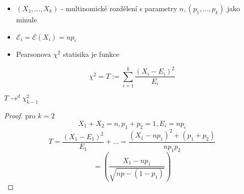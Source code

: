 \documentclass[../main.tex]{subfiles}
\begin{document}
\begin{definition}
    \begin{itemize}
        \item $(X_1,\dots,X_k)$ - multinomické rozdělení s parametry $n, (p_1,\dots,p_k)$ jako minule
        \item $\mathcal{E}_i = \mathcal{E}(X_i) = np_i$
        \item Pearsonova $\chi^2$ statisika je funkce
    \end{itemize}
    \[\chi^2 = T:= \sum^k_{i=1} \frac{(X_i - E_i)^2}{E_i}\]
\end{definition}


\begin{theorem}
    $T \rightarrow^d \chi^2_{k-1}$
\end{theorem}
\begin{proof}
    pro $k=2$
    \[X_1 + X_2 = n, p_1 + p_2 = 1, E_i = np_i\]
    \[T = \frac{(X_1 - E_1)^2}{E_1} + \dots = \frac{(X_1 - np_1)^2 + (p_1 + p_2)}{np_1p_2}\]
    \[ = \left(\frac{X_1 - np_1}{\sqrt{np - (1-p_1)}}\right)\]
\end{proof}
\end{document}
